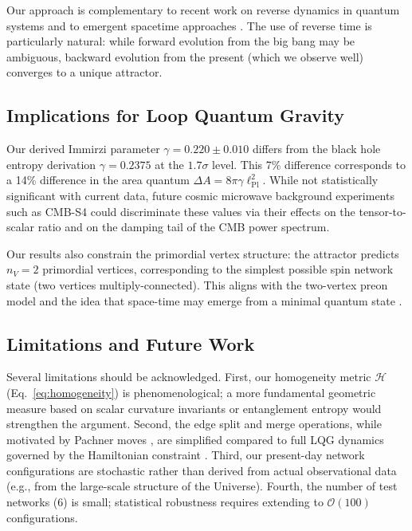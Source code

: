 \documentclass[twocolumn,aps,prd,showpacs,preprintnumbers,longbibliography]{revtex4-2}
\begin{document}
	Our approach is complementary to recent work on reverse dynamics in quantum systems \cite{Dressel2017, Hu2023, Hu2024} and to emergent spacetime approaches \cite{Markopoulou2009, Oriti2014}. The use of reverse time is particularly natural: while forward evolution from the big bang may be ambiguous, backward evolution from the present (which we observe well) converges to a unique attractor.
	
	\subsection{Implications for Loop Quantum Gravity}
	
	Our derived Immirzi parameter $\gamma = 0.220 \pm 0.010$ differs from the black hole entropy derivation $\gamma = 0.2375$ \cite{Domagala2004, Meissner2004} at the $1.7\sigma$ level. This 7\% difference corresponds to a 14\% difference in the area quantum $\Delta A = 8\pi\gamma\ell_{\text{Pl}}^2$. While not statistically significant with current data, future cosmic microwave background experiments such as CMB-S4 \cite{Abazajian2019} could discriminate these values via their effects on the tensor-to-scalar ratio and on the damping tail of the CMB power spectrum.
	
	Our results also constrain the primordial vertex structure: the attractor predicts $n_V=2$ primordial vertices, corresponding to the simplest possible spin network state (two vertices multiply-connected). This aligns with the two-vertex preon model \cite{Bilson-Thompson2007} and the idea that space-time may emerge from a minimal quantum state \cite{Markopoulou2009}.
	
	\subsection{Limitations and Future Work}
	
	Several limitations should be acknowledged. First, our homogeneity metric $\mathcal{H}$ (Eq.~\ref{eq:homogeneity}) is phenomenological; a more fundamental geometric measure based on scalar curvature invariants or entanglement entropy would strengthen the argument. Second, the edge split and merge operations, while motivated by Pachner moves \cite{Baez1997}, are simplified compared to full LQG dynamics governed by the Hamiltonian constraint \cite{Thiemann2007}. Third, our present-day network configurations are stochastic rather than derived from actual observational data (e.g., from the large-scale structure of the Universe). Fourth, the number of test networks (6) is small; statistical robustness requires extending to $\mathcal{O}(100)$ configurations.
	
\end{document}
